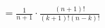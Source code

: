 \documentclass[preview]{standalone}
\begin{document}
\begin{align*}
= \frac{1}{n+1} \cdot \frac{(n+1)!}{(k+1)!(n-k)!}
\end{align*}
\end{document}
